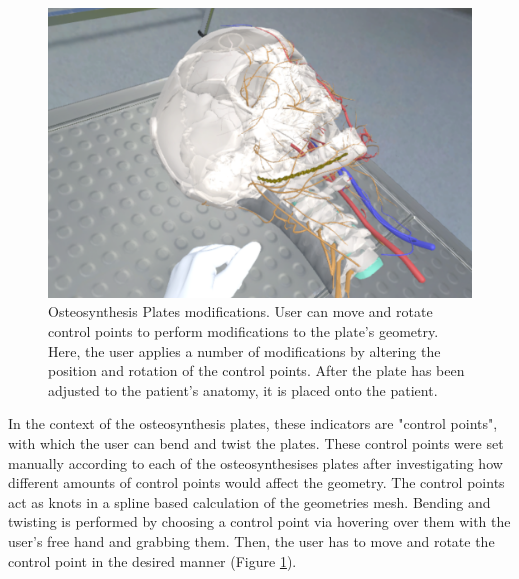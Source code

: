 \begin{figure}
\begin{minipage}{.5\textwidth}
  \end{minipage}%
  \begin{minipage}{.5\textwidth}
    \centering
    \includegraphics[width=0.997\linewidth]{images/implementation/features/procedures/osteo_4.png}
  \end{minipage}
  \caption{\label{fig::FeatureMetalPlate2}Osteosynthesis Plates modifications. User can move and rotate control points to perform modifications to the plate's geometry. Here, the user applies a number of modifications by altering the position and rotation of the control points. After the plate has been adjusted to the patient's anatomy, it is placed onto the patient.} 
\end{figure}

In the context of the osteosynthesis plates, these indicators are "control points", with which the user can bend and twist the plates.
These control points were set manually according to each of the osteosynthesises plates after investigating how different amounts of control points would affect the geometry.
The control points act as knots in a spline based calculation of the geometries mesh.
Bending and twisting is performed by choosing a control point via hovering over them with the user's free hand and grabbing them.
Then, the user has to move and rotate the control point in the desired manner (Figure \ref{fig::FeatureMetalPlate2}).
